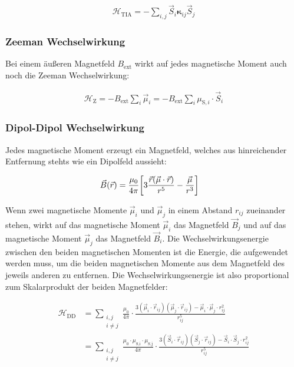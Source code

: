 \documentclass[main.tex]{subfiles}
\begin{document}

\begin{align}
	\mathcal{H}_{\text{TIA}} = -\sum_{i,j} \vec{S}_i \mathbf{\kappa}_{ij}
	\vec{S}_j\label{eq:hamilton-tia}
\end{align}
\subsubsection*{Zeeman Wechselwirkung}
Bei einem äußeren Magnetfeld \(B_\text{ext}\) wirkt auf jedes magnetische
Moment auch noch die Zeeman Wechselwirkung:

\begin{align}
	\mathcal{H}_{\text{Z}} = - B_\text{ext} \sum_{i} \vec{\mu}_i = -
	B_\text{ext} \sum_{i} \mu_{\text{S},i} \cdot \vec{S}_i\label{eq:hamilton-zeeman}
\end{align}

\subsubsection*{Dipol-Dipol Wechselwirkung}

Jedes magnetische Moment erzeugt ein Magnetfeld, welches aus hinreichender
Entfernung stehts wie ein Dipolfeld aussieht:

\begin{align}
	\vec{B}(\vec{r}) & = \frac{\mu_0}{4\pi} \qty[3 \frac{\vec{r}(\vec{\mu}
			\cdot
			\vec{r})}{r^5} -
		\frac{\vec{\mu}}{r^3}]\label{eq:dipolmoment}
\end{align}\cite{Nolting-3-elektrodynamik}

Wenn zwei magnetische Momente \(\vec{\mu}_i\) und \(\vec{\mu}_j\) in einem
Abstand \(r_{ij}\) zueinander stehen, wirkt auf das magnetische Moment
\(\vec{\mu}_i\) das Magnetfeld \(\vec{B}_j\) und auf das magnetische Moment
\(\vec{\mu}_j\) das Magnetfeld \(\vec{B}_i\). Die Wechselwirkungsenergie
zwischen den beiden magnetischen Momenten ist die Energie, die aufgewendet
werden muss, um die beiden magnetischen Momente aus dem Magnetfeld des jeweils
anderen zu entfernen. Die Wechselwirkungsenergie ist also proportional zum
Skalarprodukt der beiden Magnetfelder:

\begin{align}
	\mathcal{H}_{\text{DD}} & = \sum_{\substack{i,j           \\ i \neq j}}
	\frac{\mu_0}{4\pi}
	\cdot  \frac{3(\vec{\mu}_i \cdot \vec{r}_{ij})(\vec{\mu}_j \cdot
		\vec{r}_{ij})
	- \vec{\mu}_i \cdot \vec{\mu}_j \cdot r_{ij}^2}{r_{ij}^5} \\
	                        & = \sum_{\substack{i,j           \\ i \neq j}}
	\frac{\mu_0 \cdot \mu_{\text{S,i}} \cdot \mu_{\text{S,j}}}{4\pi}
	\cdot \frac{3(\vec{S}_i \cdot \vec{r}_{ij})(\vec{S}_j \cdot
		\vec{r}_{ij})
		- \vec{S}_i \cdot \vec{S}_j \cdot r_{ij}^2}{r_{ij}^5}\label{eq:hamilton-dd}
\end{align}
\end{document}
